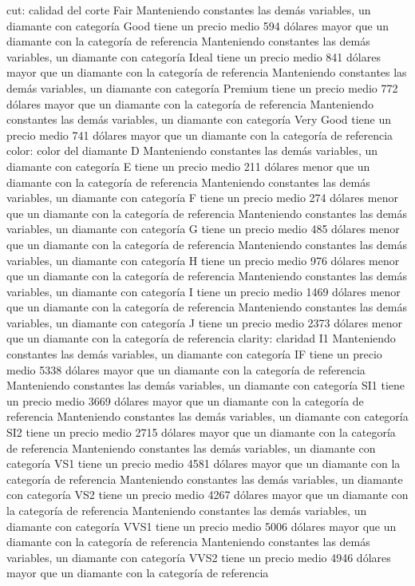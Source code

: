 \documentclass[
  spanish,
]{article}
\begin{document}
cut: calidad del corte Fair Manteniendo constantes las demás variables,
un diamante con categoría Good tiene un precio medio 594 dólares mayor
que un diamante con la categoría de referencia Manteniendo constantes
las demás variables, un diamante con categoría Ideal tiene un precio
medio 841 dólares mayor que un diamante con la categoría de referencia
Manteniendo constantes las demás variables, un diamante con categoría
Premium tiene un precio medio 772 dólares mayor que un diamante con la
categoría de referencia Manteniendo constantes las demás variables, un
diamante con categoría Very Good tiene un precio medio 741 dólares mayor
que un diamante con la categoría de referencia color: color del diamante
D Manteniendo constantes las demás variables, un diamante con categoría
E tiene un precio medio 211 dólares menor que un diamante con la
categoría de referencia Manteniendo constantes las demás variables, un
diamante con categoría F tiene un precio medio 274 dólares menor que un
diamante con la categoría de referencia Manteniendo constantes las demás
variables, un diamante con categoría G tiene un precio medio 485 dólares
menor que un diamante con la categoría de referencia Manteniendo
constantes las demás variables, un diamante con categoría H tiene un
precio medio 976 dólares menor que un diamante con la categoría de
referencia Manteniendo constantes las demás variables, un diamante con
categoría I tiene un precio medio 1469 dólares menor que un diamante con
la categoría de referencia Manteniendo constantes las demás variables,
un diamante con categoría J tiene un precio medio 2373 dólares menor que
un diamante con la categoría de referencia clarity: claridad I1
Manteniendo constantes las demás variables, un diamante con categoría IF
tiene un precio medio 5338 dólares mayor que un diamante con la
categoría de referencia Manteniendo constantes las demás variables, un
diamante con categoría SI1 tiene un precio medio 3669 dólares mayor que
un diamante con la categoría de referencia Manteniendo constantes las
demás variables, un diamante con categoría SI2 tiene un precio medio
2715 dólares mayor que un diamante con la categoría de referencia
Manteniendo constantes las demás variables, un diamante con categoría
VS1 tiene un precio medio 4581 dólares mayor que un diamante con la
categoría de referencia Manteniendo constantes las demás variables, un
diamante con categoría VS2 tiene un precio medio 4267 dólares mayor que
un diamante con la categoría de referencia Manteniendo constantes las
demás variables, un diamante con categoría VVS1 tiene un precio medio
5006 dólares mayor que un diamante con la categoría de referencia
Manteniendo constantes las demás variables, un diamante con categoría
VVS2 tiene un precio medio 4946 dólares mayor que un diamante con la
categoría de referencia
\end{document}
